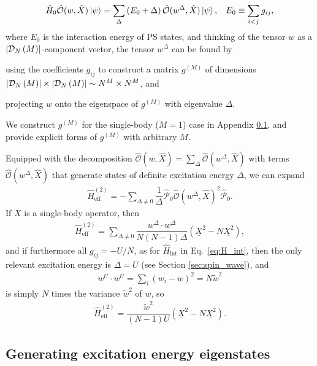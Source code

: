 \documentclass[aps,pra,nofootinbib,twocolumn,superscriptaddress]{revtex4-2}
\renewcommand{\t}{\text} %
\newcommand{\f}[2]{\dfrac{#1}{#2}} %
\newcommand{\p}[1]{\left(#1\right)} %
\newcommand{\1}{\mathds{1}}
\renewcommand{\H}{\hat H}
\renewcommand{\O}{\hat{\mathcal{O}}}
\renewcommand{\P}{\hat{\mathcal{P}}}
\newcommand{\D}{\mathcal{D}}
\newcommand{\col}{\underline}
\newcommand{\mean}{\overline}
\begin{document}
\begin{align}
  \H_0 \O(w,\hat X) \ket\psi
  = \sum_\Delta \p{E_0+\Delta} \O(w^\Delta,\hat X) \ket\psi,
  &&
  E_0 \equiv \sum_{i<j} g_{ij},
  \label{eq:excitation}
\end{align}
where $E_0$ is the interaction energy of PS states, and thinking of the tensor $w$ as a $\abs{\D_N\p{M}}$-component vector, the tensor $w^\Delta$ can be found by
\begin{enumerate*}
\item using the coefficients $g_{ij}$ to construct a matrix $g^{(M)}$ of dimensions $\abs{\D_N\p{M}}\times\abs{\D_N\p{M}}\sim N^M\times N^M$, and
\item projecting $w$ onto the eigenspace of $g^{(M)}$ with eigenvalue $\Delta$.
\end{enumerate*}
We construct $g^{(M)}$ for the single-body ($M=1$) case in Appendix \ref{sec:eigenstates}, and provide explicit forms of $g^{(M)}$ with arbitrary $M$.

Equipped with the decomposition $\O(w,\hat X)=\sum_\Delta\O(w^\Delta,\hat X)$ with terms $\O(w^\Delta,\hat X)$ that generate states of definite excitation energy $\Delta$, we can expand
\begin{align}
  \H_{\t{eff}}^{(2)} = -\sum_{\Delta\ne0} \f1\Delta
  \P_0 \O(w^\Delta,\hat X)^2 \P_0.
\end{align}
If $X$ is a single-body operator, then
\begin{align}
  \H_{\t{eff}}^{(2)}
  = \sum_{\Delta\ne0} \f{w^\Delta\cdot w^\Delta}{N\p{N-1}\Delta}
  \p{\col{X}^2 - N \col{X^2}},
\end{align}
and if furthermore all $g_{ij}=-U/N$, as for $\H_{\t{int}}$ in Eq.~\eqref{eq:H_int}, then the only relevant excitation energy is $\Delta=U$ (see Section \ref{sec:spin_wave}), and
\begin{align}
  w^U\cdot w^U = \sum_i \p{w_i-\mean w}^2 = N \widetilde{w}^2
\end{align}
is simply $N$ times the variance $\widetilde{w}^2$ of $w$, so
\begin{align}
  \H_{\t{eff}}^{(2)}
  = \f{\widetilde{w}^2}{\p{N-1}U} \p{\col{X}^2 - N \col{X^2}}.
\end{align}

\subsection{Generating excitation energy eigenstates}
\label{sec:eigenstates}
\end{document}
